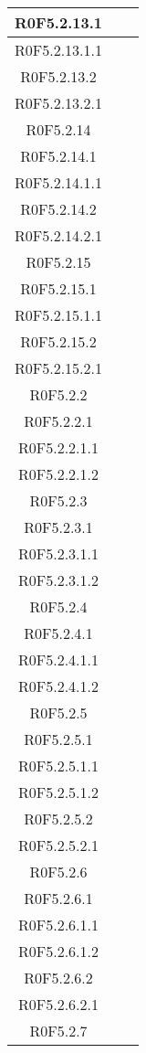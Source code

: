 \begin{center}
\begin{longtable}{|c|c|c|}
\hline
R0F5.2.13.1 &  &  \\
\hline
R0F5.2.13.1.1 &  &  \\
\hline
R0F5.2.13.2 &  &  \\
\hline
R0F5.2.13.2.1 &  &  \\
\hline
R0F5.2.14 &  &  \\
\hline
R0F5.2.14.1 &  &  \\
\hline
R0F5.2.14.1.1 &  &  \\
\hline
R0F5.2.14.2 &  &  \\
\hline
R0F5.2.14.2.1 &  &  \\
\hline
R0F5.2.15 &  &  \\
\hline
R0F5.2.15.1 &  &  \\
\hline
R0F5.2.15.1.1 &  &  \\
\hline
R0F5.2.15.2 &  &  \\
\hline
R0F5.2.15.2.1 &  &  \\
\hline
R0F5.2.2 &  &  \\
\hline
R0F5.2.2.1 &  &  \\
\hline
R0F5.2.2.1.1 &  &  \\
\hline
R0F5.2.2.1.2 &  &  \\
\hline
R0F5.2.3 &  &  \\
\hline
R0F5.2.3.1 &  &  \\
\hline
R0F5.2.3.1.1 &  &  \\
\hline
R0F5.2.3.1.2 &  &  \\
\hline
R0F5.2.4 &  &  \\
\hline
R0F5.2.4.1 &  &  \\
\hline
R0F5.2.4.1.1 &  &  \\
\hline
R0F5.2.4.1.2 &  &  \\
\hline
R0F5.2.5 &  &  \\
\hline
R0F5.2.5.1 &  &  \\
\hline
R0F5.2.5.1.1 &  &  \\
\hline
R0F5.2.5.1.2 &  &  \\
\hline
R0F5.2.5.2 &  &  \\
\hline
R0F5.2.5.2.1 &  &  \\
\hline
R0F5.2.6 &  &  \\
\hline
R0F5.2.6.1 &  &  \\
\hline
R0F5.2.6.1.1 &  &  \\
\hline
R0F5.2.6.1.2 &  &  \\
\hline
R0F5.2.6.2 &  &  \\
\hline
R0F5.2.6.2.1 &  &  \\
\hline
R0F5.2.7 &  &  \\

\end{longtable}
\end{center}

